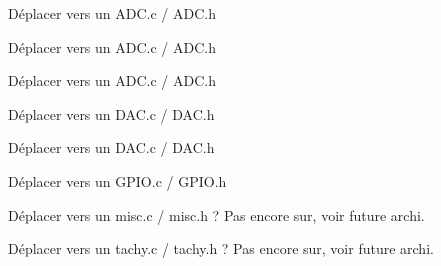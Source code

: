 
\begin{DoxyRefList}
\item[\label{todo__todo000006}%
\hypertarget{todo__todo000006}{}%
Member \hyperlink{main_8c_a560179c9f943e8caf404c35c282f17c4}{A\+D\+C\+\_\+\+Config} (void)]Déplacer vers un A\+D\+C.\+c / A\+D\+C.\+h  
\item[\label{todo__todo000001}%
\hypertarget{todo__todo000001}{}%
Member \hyperlink{main_8c_a6e2af20368b6a98997e2152308ac64ba}{A\+D\+C\+\_\+\+Get\+Pot\+Value} (uint16\+\_\+t $\ast$value)]Déplacer vers un A\+D\+C.\+c / A\+D\+C.\+h  
\item[\label{todo__todo000002}%
\hypertarget{todo__todo000002}{}%
Member \hyperlink{main_8c_a54bf6b15aecba3352e559b02e8f17e32}{A\+D\+C\+\_\+\+Get\+Tachy\+Value} (uint16\+\_\+t $\ast$value)]Déplacer vers un A\+D\+C.\+c / A\+D\+C.\+h  
\item[\label{todo__todo000007}%
\hypertarget{todo__todo000007}{}%
Member \hyperlink{main_8c_a1c4fcf5b7727573c3b30e5b95e61cdcc}{D\+A\+C\+\_\+\+Config} (void)]Déplacer vers un D\+A\+C.\+c / D\+A\+C.\+h  
\item[\label{todo__todo000004}%
\hypertarget{todo__todo000004}{}%
Member \hyperlink{main_8c_ae52255c535a22134f4a645458fbc5ddb}{D\+A\+C\+\_\+\+Set\+Values} (uint16\+\_\+t dac\+\_\+p, uint16\+\_\+t dac\+\_\+n)]Déplacer vers un D\+A\+C.\+c / D\+A\+C.\+h  
\item[\label{todo__todo000005}%
\hypertarget{todo__todo000005}{}%
Member \hyperlink{main_8c_a56c8ff165146f2f845a0bf90e3eacd39}{G\+P\+I\+O\+\_\+\+Config} (void)]Déplacer vers un G\+P\+I\+O.\+c / G\+P\+I\+O.\+h  
\item[\label{todo__todo000008}%
\hypertarget{todo__todo000008}{}%
Member \hyperlink{main_8c_ab5e09814056d617c521549e542639b7e}{Sys\+Tick\+\_\+\+Handler} (void)]Déplacer vers un misc.\+c / misc.\+h ? Pas encore sur, voir future archi.  
\item[\label{todo__todo000003}%
\hypertarget{todo__todo000003}{}%
Member \hyperlink{main_8c_af255127f7d5283ab3de381e419d2bf1b}{Tachy\+\_\+to\+\_\+\+R\+PM} (uint16\+\_\+t value\+\_\+to\+\_\+convert, uint16\+\_\+t $\ast$speed\+\_\+rpm)]Déplacer vers un tachy.\+c / tachy.\+h ? Pas encore sur, voir future archi. 
\end{DoxyRefList}